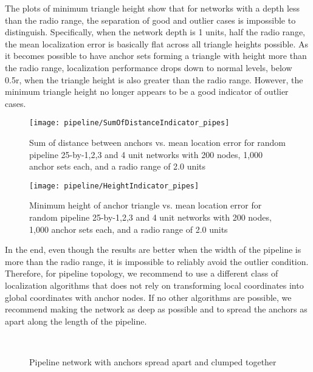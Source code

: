The plots of minimum triangle height show that for networks with a depth less than the radio range, the separation of good and outlier cases is impossible to distinguish.  Specifically, when the network depth is 1 units, half the radio range, the mean localization error is basically flat across all triangle heights possible.  As it becomes possible to have anchor sets forming a triangle with height more than the radio range, localization performance drops down to normal levels, below 0.5r, when the triangle height is also greater than the radio range.  However, the minimum triangle height no longer appears to be a good indicator of outlier cases. 

\begin{figure}
  \centering
	\texttt{[image: pipeline/SumOfDistanceIndicator\_pipes]}
	\caption[Sum of distance between anchors vs. mean location error]{Sum of distance between anchors vs. mean location error for random pipeline 25-by-1,2,3 and 4 unit networks with 200 nodes, 1,000 anchor sets each, and a radio range of 2.0 units}
	\label{fig:pipessum}
\end{figure}
\begin{figure}
  \centering
	\texttt{[image: pipeline/HeightIndicator\_pipes]}
	\caption[Minimum height of anchor triangle vs. mean location error]{Minimum height of anchor triangle vs. mean location error for random pipeline 25-by-1,2,3 and 4 unit networks with 200 nodes, 1,000 anchor sets each, and a radio range of 2.0 units}
	\label{fig:pipesheight}
\end{figure}

In the end, even though the results are better when the width of the pipeline is more than the radio range, it is impossible to reliably avoid the outlier condition.  Therefore, for pipeline topology, we recommend to use a different class of localization algorithms that does not rely on transforming local coordinates into global coordinates with anchor nodes.  If no other algorithms are possible, we recommend making the network as deep as possible and to spread the anchors as apart along the length of the pipeline.  

\begin{figure}
  \centering
	\\
	\caption{Pipeline network with anchors spread apart and clumped together}
	\label{fig:pipesspread}
\end{figure}
